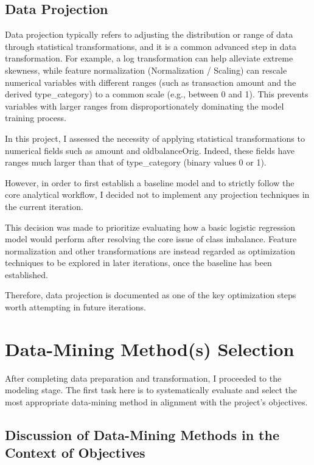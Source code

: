 \documentclass[sigplan,screen]{acmart}
\begin{document}
\subsection{Data Projection}

Data projection typically refers to adjusting the distribution or range of data through statistical transformations, and it is a common advanced step in data transformation. For example, a log transformation can help alleviate extreme skewness, while feature normalization (Normalization / Scaling) can rescale numerical variables with different ranges (such as transaction amount and the derived type\_category) to a common scale (e.g., between 0 and 1). This prevents variables with larger ranges from disproportionately dominating the model training process.

In this project, I assessed the necessity of applying statistical transformations to numerical fields such as amount and oldbalanceOrig. Indeed, these fields have ranges much larger than that of type\_category (binary values 0 or 1).

However, in order to first establish a baseline model and to strictly follow the core analytical workflow, I decided not to implement any projection techniques in the current iteration.

This decision was made to prioritize evaluating how a basic logistic regression model would perform after resolving the core issue of class imbalance. Feature normalization and other transformations are instead regarded as optimization techniques to be explored in later iterations, once the baseline has been established.

Therefore, data projection is documented as one of the key optimization steps worth attempting in future iterations.

\section{Data-Mining Method(s) Selection}

After completing data preparation and transformation, I proceeded to the modeling stage. The first task here is to systematically evaluate and select the most appropriate data-mining method in alignment with the project's objectives.

\subsection{Discussion of Data-Mining Methods in the Context of Objectives}
\end{document}
